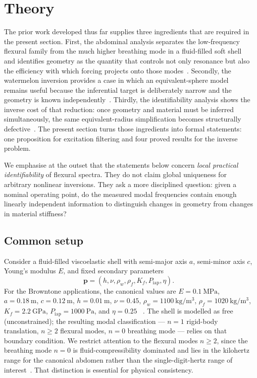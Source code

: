 
\section{Theory}
\label{sec:theory}

The prior work developed thus far supplies three ingredients that are required in
the present section.  First, the abdominal analysis separates the low-frequency
flexural family from the much higher breathing mode in a fluid-filled soft shell
and identifies geometry as the quantity that controls not only resonance but
also the efficiency with which forcing projects onto those modes~\cite{BrowntoneP1}.
Secondly, the watermelon inversion provides a case in which an equivalent-sphere
model remains useful because the inferential target is deliberately narrow and
the geometry is known independently~\cite{BrowntoneP7}.  Thirdly, the
identifiability analysis shows the inverse cost of that reduction: once
geometry and material must be inferred simultaneously, the same
equivalent-radius simplification becomes structurally defective~\cite{BrowntoneP8}.  The
present section turns those ingredients into
formal statements: one proposition for excitation filtering and four proved
results for the inverse problem.

We emphasise at the outset that the statements below concern \emph{local
practical identifiability} of flexural spectra.  They do not claim global
uniqueness for arbitrary nonlinear inversions.  They ask a more disciplined
question: given a nominal operating point, do the measured modal frequencies
contain enough linearly independent information to distinguish changes in
geometry from changes in material stiffness?

\subsection{Common setup}

Consider a fluid-filled viscoelastic shell with semi-major axis $a$,
semi-minor axis $c$, Young's modulus $E$, and fixed secondary parameters
\[
  \mathbf{p}
  =
  (h,\nu,\rho_w,\rho_f,K_f,P_\mathrm{iap},\eta).
\]
For the Browntone applications, the canonical values are
$E=\SI{0.1}{\mega\pascal}$, $a=\SI{0.18}{\metre}$, $c=\SI{0.12}{\metre}$,
$h=\SI{0.01}{\metre}$, $\nu=0.45$,
$\rho_w=\SI{1100}{\kilogram\per\metre\cubed}$,
$\rho_f=\SI{1020}{\kilogram\per\metre\cubed}$,
$K_f=\SI{2.2}{\giga\pascal}$,
$P_\mathrm{iap}=\SI{1000}{\pascal}$, and $\eta=0.25$
~\cite{BrowntoneP1,BrowntoneP8}.  The shell is modelled as free
(unconstrained); the resulting modal classification --- $n=1$ rigid-body
translation, $n\geq 2$ flexural modes, $n=0$ breathing mode --- relies on that
boundary condition.  We restrict attention to the flexural modes
$n \geq 2$, since the breathing mode $n=0$ is fluid-compressibility dominated
and lies in the kilohertz range for the canonical abdomen rather than the
single-digit-hertz range of interest~\cite{BrowntoneP1}.  That distinction is
essential for physical consistency.

